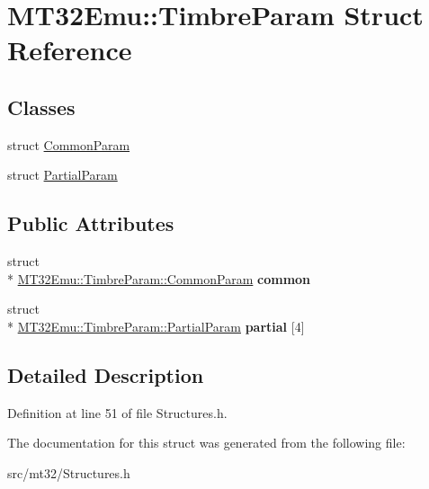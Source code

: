\hypertarget{structMT32Emu_1_1TimbreParam}{\section{M\-T32\-Emu\-:\-:Timbre\-Param Struct Reference}
\label{structMT32Emu_1_1TimbreParam}
}
\subsection*{Classes}
\begin{DoxyCompactItemize}
\item 
struct \hyperlink{structMT32Emu_1_1TimbreParam_1_1CommonParam}{Common\-Param}
\item 
struct \hyperlink{structMT32Emu_1_1TimbreParam_1_1PartialParam}{Partial\-Param}
\end{DoxyCompactItemize}
\subsection*{Public Attributes}
\begin{DoxyCompactItemize}
\item 
\hypertarget{structMT32Emu_1_1TimbreParam_a348652f7798349c4ba9ef509c556dabc}{struct \\*
\hyperlink{structMT32Emu_1_1TimbreParam_1_1CommonParam}{M\-T32\-Emu\-::\-Timbre\-Param\-::\-Common\-Param} {\bfseries common}}\label{structMT32Emu_1_1TimbreParam_a348652f7798349c4ba9ef509c556dabc}

\item 
\hypertarget{structMT32Emu_1_1TimbreParam_a71d3f521c2c0e2bd72bf3a2201a3ebc4}{struct \\*
\hyperlink{structMT32Emu_1_1TimbreParam_1_1PartialParam}{M\-T32\-Emu\-::\-Timbre\-Param\-::\-Partial\-Param} {\bfseries partial} \mbox{[}4\mbox{]}}\label{structMT32Emu_1_1TimbreParam_a71d3f521c2c0e2bd72bf3a2201a3ebc4}

\end{DoxyCompactItemize}


\subsection{Detailed Description}


Definition at line 51 of file Structures.\-h.



The documentation for this struct was generated from the following file\-:\begin{DoxyCompactItemize}
\item 
src/mt32/Structures.\-h\end{DoxyCompactItemize}

